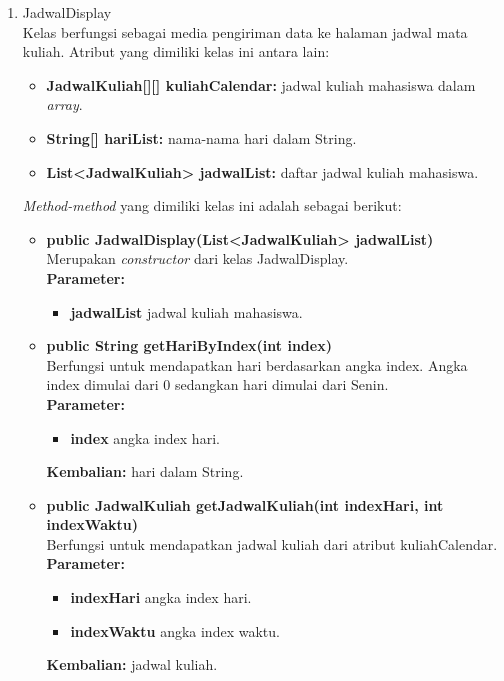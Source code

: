 \begin{enumerate}
		\item JadwalDisplay\\
		Kelas berfungsi sebagai media pengiriman data ke halaman jadwal mata kuliah. Atribut yang dimiliki kelas ini antara lain:
		\begin{itemize}
			\item \textbf{JadwalKuliah[][] kuliahCalendar:} jadwal kuliah mahasiswa dalam \textit{array}.
			\item \textbf{String[] hariList:} nama-nama hari dalam String.
			\item \textbf{List<JadwalKuliah> jadwalList:} daftar jadwal kuliah mahasiswa.
		\end{itemize}
	\textit{Method-method} yang dimiliki kelas ini adalah sebagai berikut:
		\begin{itemize}
			\item \textbf{public JadwalDisplay(List<JadwalKuliah> jadwalList)}\\
			Merupakan \textit{constructor} dari kelas JadwalDisplay.\\
			\textbf{Parameter:}
			\begin{itemize}
				\item \textbf{jadwalList} jadwal kuliah mahasiswa.
			\end{itemize}
			
			\item \textbf{public String getHariByIndex(int index)}\\
				Berfungsi untuk mendapatkan hari berdasarkan angka index. Angka index dimulai dari 0 sedangkan hari dimulai dari Senin.\\
				\textbf{Parameter:}
				\begin{itemize}
					\item \textbf{index} angka index hari.
				\end{itemize}
				\textbf{Kembalian:} hari dalam String.
		
		\item \textbf{public JadwalKuliah getJadwalKuliah(int indexHari, int indexWaktu)}\\
				Berfungsi untuk mendapatkan jadwal kuliah dari atribut kuliahCalendar.\\
				\textbf{Parameter:}
				\begin{itemize}
					\item \textbf{indexHari} angka index hari.
					\item \textbf{indexWaktu} angka index waktu.
				\end{itemize}
				\textbf{Kembalian:} jadwal kuliah.
		

\end{itemize}
\end{enumerate}
